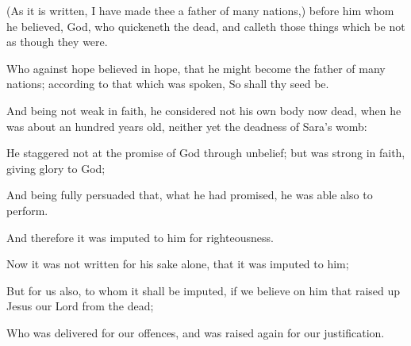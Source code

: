 {(As it is
written, I have
made
thee a
father of
many
nations,)
before him
whom he
believed,
{}
God, who
quickeneth the
dead,
and
calleth those things which
be
not
as though they
were.

Who
against
hope
believed
in
hope,
that
he might
become the
father of
many
nations; according
to that which was
spoken,
So
shall
thy
seed
be.

And
being
not
weak in
faith, he
considered
not his
own
body
now
dead, when he was
about an hundred years
old, neither
yet the
deadness
of
Sara’s
womb:

He
staggered
not
at the
promise of
God through
unbelief;
but was
strong in
faith,
giving
glory to
God;

And being fully
persuaded
that,
what he had
promised, he
was
able
also to
perform.

And
therefore it was
imputed to
him
for
righteousness.

Now it
was
not
written
for
his
sake
alone,
that it was
imputed to
him;

But
for
us
also, to
whom it
shall be
imputed, if
we
believe
on him that raised
up
Jesus
our
Lord
from the
dead;

Who was
delivered
for
our
offences,
and was raised
again
for
our
justification.




\par }
